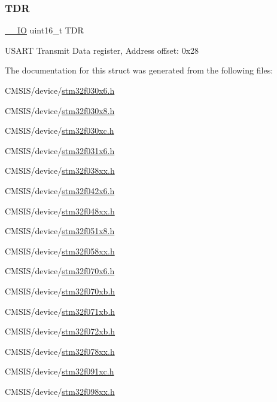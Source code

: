 \subsubsection{\texorpdfstring{T\+DR}{TDR}}
{\footnotesize\ttfamily \hyperlink{core__sc300_8h_aec43007d9998a0a0e01faede4133d6be}{\+\_\+\+\_\+\+IO} uint16\+\_\+t T\+DR}

U\+S\+A\+RT Transmit Data register, Address offset\+: 0x28 

The documentation for this struct was generated from the following files\+:\begin{DoxyCompactItemize}
\item 
C\+M\+S\+I\+S/device/\hyperlink{stm32f030x6_8h}{stm32f030x6.\+h}\item 
C\+M\+S\+I\+S/device/\hyperlink{stm32f030x8_8h}{stm32f030x8.\+h}\item 
C\+M\+S\+I\+S/device/\hyperlink{stm32f030xc_8h}{stm32f030xc.\+h}\item 
C\+M\+S\+I\+S/device/\hyperlink{stm32f031x6_8h}{stm32f031x6.\+h}\item 
C\+M\+S\+I\+S/device/\hyperlink{stm32f038xx_8h}{stm32f038xx.\+h}\item 
C\+M\+S\+I\+S/device/\hyperlink{stm32f042x6_8h}{stm32f042x6.\+h}\item 
C\+M\+S\+I\+S/device/\hyperlink{stm32f048xx_8h}{stm32f048xx.\+h}\item 
C\+M\+S\+I\+S/device/\hyperlink{stm32f051x8_8h}{stm32f051x8.\+h}\item 
C\+M\+S\+I\+S/device/\hyperlink{stm32f058xx_8h}{stm32f058xx.\+h}\item 
C\+M\+S\+I\+S/device/\hyperlink{stm32f070x6_8h}{stm32f070x6.\+h}\item 
C\+M\+S\+I\+S/device/\hyperlink{stm32f070xb_8h}{stm32f070xb.\+h}\item 
C\+M\+S\+I\+S/device/\hyperlink{stm32f071xb_8h}{stm32f071xb.\+h}\item 
C\+M\+S\+I\+S/device/\hyperlink{stm32f072xb_8h}{stm32f072xb.\+h}\item 
C\+M\+S\+I\+S/device/\hyperlink{stm32f078xx_8h}{stm32f078xx.\+h}\item 
C\+M\+S\+I\+S/device/\hyperlink{stm32f091xc_8h}{stm32f091xc.\+h}\item 
C\+M\+S\+I\+S/device/\hyperlink{stm32f098xx_8h}{stm32f098xx.\+h}\end{DoxyCompactItemize}
